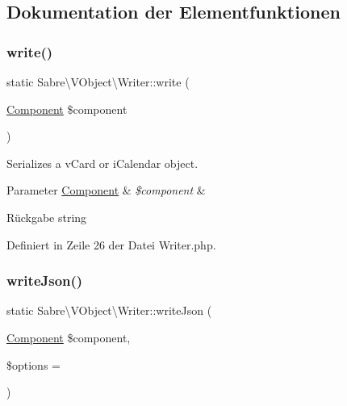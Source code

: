 \subsection{Dokumentation der Elementfunktionen}
\mbox{\label{class_sabre_1_1_v_object_1_1_writer_a4d963d7f0ccff8230c8978804ef6c976}} 
\subsubsection{\texorpdfstring{write()}{write()}}
{\footnotesize\ttfamily static Sabre\textbackslash{}\+V\+Object\textbackslash{}\+Writer\+::write (\begin{DoxyParamCaption}\item[{\mbox{\hyperlink{class_sabre_1_1_v_object_1_1_component}{Component}}}]{\$component }\end{DoxyParamCaption})\hspace{0.3cm}{\ttfamily [static]}}

Serializes a v\+Card or i\+Calendar object.


\begin{DoxyParams}[1]{Parameter}
\mbox{\hyperlink{class_sabre_1_1_v_object_1_1_component}{Component}} & {\em \$component} & \\
\hline
\end{DoxyParams}
\begin{DoxyReturn}{Rückgabe}
string 
\end{DoxyReturn}


Definiert in Zeile 26 der Datei Writer.\+php.

\mbox{\label{class_sabre_1_1_v_object_1_1_writer_ab3b3ef7e3ff4346ac0cc22afc11ef605}} 
\subsubsection{\texorpdfstring{write\+Json()}{writeJson()}}
{\footnotesize\ttfamily static Sabre\textbackslash{}\+V\+Object\textbackslash{}\+Writer\+::write\+Json (\begin{DoxyParamCaption}\item[{\mbox{\hyperlink{class_sabre_1_1_v_object_1_1_component}{Component}}}]{\$component,  }\item[{}]{\$options = {} }\end{DoxyParamCaption})\hspace{0.3cm}{\ttfamily [static]}}

